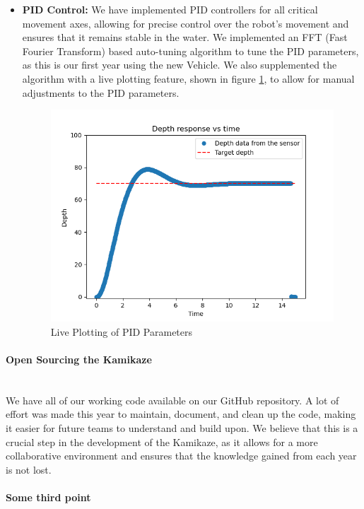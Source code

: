 \begin{itemize}[leftmargin=0pt, itemindent=10pt]
    \item \textbf{PID Control:} We have implemented PID controllers for all critical movement axes, allowing for precise control over the robot's movement and ensures that it remains stable in the water. We implemented an FFT (Fast Fourier Transform) based auto-tuning algorithm to tune the PID parameters, as this is our first year using the new Vehicle. We also supplemented the algorithm with a live
    plotting feature, shown in figure \ref{fig:pid_live}, to allow for manual adjustments to the PID parameters.
    \begin{figure}[h]
    \centering
    \includegraphics[width=\columnwidth]{Sections/2Design Rationale/images/Pid.png}
    \caption{Live Plotting of PID Parameters}
    \label{fig:pid_live}
    \end{figure}
\end{itemize}

\vspace{-1cm}
\paragraph{Open Sourcing the Kamikaze} \ \\
We have all of our working code available on our GitHub repository. A lot of effort was made this year to maintain, document, and clean up the code, making it easier for future teams to understand and build upon. We believe that this is a crucial step in the development of the Kamikaze, as it allows for a more collaborative environment and ensures that the knowledge gained from each year is not lost. 

\paragraph{Some third point} \ \\
\vspace{-0.5cm}




